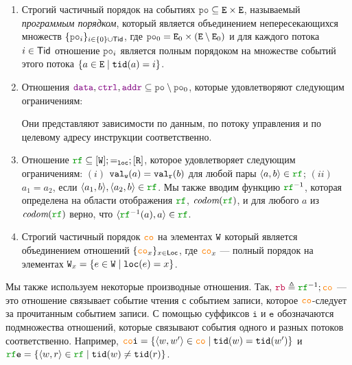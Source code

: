 \begin{definition}
\begin{enumerate}
\item Строгий частичный порядок на событиях $\lPO \suq \lE \times \lE$, называемый \emph{программым порядком},
      который является объединением непересекающихся множеств $\{\lPO_i\}_{i\in \{0\} \cup \Tid}$,
      где $\lPO_0=\lE_0\times (\lE\setminus \lE_0)$ и для каждого потока 
      $i\in\mathsf{Tid}$ отношение $\lPO_i$ является полным порядоком на множестве событий этого потока
      $\{a\in {\mathtt{E}} \; | \; {\mathtt{tid}}(a)=i\}$.

\item Отношения $\lDATA,\lCTRL,\lADDR\suq \lPO\setminus \lPO_0$, которые удовлетворяют следующим ограничениям:
\vspace{-5pt}
Они представляют зависимости по данным, по потоку управления и по целевому адресу инструкции соответственно.

\item Отношение $\lRF \suq [\lW]; {=_\lLOC}; [\lR]$, которое удовлетворяет следующим ограничениям:
$(i)$ ${\mathtt{val_w}}(a)={\mathtt{val_r}}(b)$ для любой пары $\tup{a,b}\in \lRF$;
$(ii)$ $a_1=a_2$, если $\tup{a_1,b},\tup{a_2,b}\in \lRF$. Мы также вводим функцию $\lRF^{-1}$, которая определена на
области отображения $\lRF$, $\codom{\lRF}$, и для любого $a$ из $\codom{\lRF}$ верно, что $\tup{\lRF^{-1}(a), a} \in \lRF$.

\item Строгий частичный порядок $\lCO$ на элементах ${\mathtt{W}}$
      который является объединением отношений $\{\lCOx\}_{x\in\Loc}$,
      где $\lCOx$ --- полный порядок на элементах ${\mathtt{W}}_x = \{ e \in {\mathtt{W}} \; | \; {\mathtt{loc}}(e) = x\}$.
\end{enumerate}
\end{definition}

Мы также используем некоторые производные отношения. Так, $\lFR \defeq \lRF^{-1}; \lCO$ --- это отношение
связывает событие чтения с событием записи, которое $\lCO$-следует за прочитанным событием записи.
С помощью суффиксов $\mathtt{i}$ и $\mathtt{e}$ обозначаются подмножества отношений, которые связывают события одного
и разных потоков соответственно. Например, $\lCOI = \{ \tup{w, w'} \in \lCO \mid \lTID(w) = \lTID(w') \}$ и
$\lRFE = \{ \tup{w, r} \in \lRF \mid \lTID(w) \neq \lTID(r) \}$.

